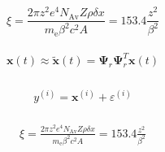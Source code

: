 \begin{equation}
\xi  = \frac{2\pi z^2 e^4 N_{\textrm{Av}} Z \rho
	\delta x}{m_{\textrm{e}} \beta^2 c^2 A} =  153.4 \frac{z^2}{\beta^2}
\end{equation}

\begin{align}
\label{GalerkinProj2}
\begin{split}
{{\mathbf x}(t)}\approx{\mathbf{\tilde{x}}}(t)={\mathbf\Psi}_{r}{\mathbf\Psi}_{r}^{T}{\mathbf{x}}(t)
\end{split}
\end{align}

\begin{align}
\label{GalerkinProj2}
\begin{split}
{{y}^{(i)}}={{\mathbf{x}}^{(i)}}+{{\varepsilon }^{(i)}}
\end{split}
\end{align}

\begin{align}
\label{GalerkinProj2}
\begin{split}
\xi  = \frac{2\pi z^2 e^4 N_{\textrm{Av}} Z \rho
	\delta x}{m_{\textrm{e}} \beta^2 c^2 A} =  153.4 \frac{z^2}{\beta^2}
\end{split}
\end{align}